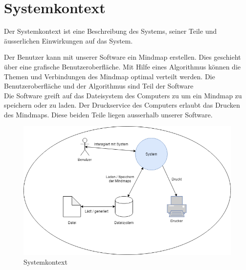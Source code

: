 \section{Systemkontext}
\label{sec:systemkontext}
Der Systemkontext ist eine Beschreibung des Systems, seiner Teile und äusserlichen Einwirkungen auf das System.

Der Benutzer kann mit unserer Software ein Mindmap erstellen. Dies geschieht über eine grafische Benutzeroberfläche. Mit Hilfe eines Algorithmus können die Themen und Verbindungen des Mindmap optimal verteilt werden. Die Benutzeroberfläche und der Algorithmus sind Teil der Software\\
Die Software greift auf das Dateisystem des Computers zu um ein Mindmap zu speichern oder zu laden. Der Druckservice des Computers erlaubt das Drucken des Mindmaps. Diese beiden Teile liegen ausserhalb unserer Software.

\begin{figure}[H]
	\centering
		\includegraphics[width=\textwidth]{images/Systemkontext.png}
	\caption{Systemkontext}
	\label{fig:systemkontext}
\end{figure}